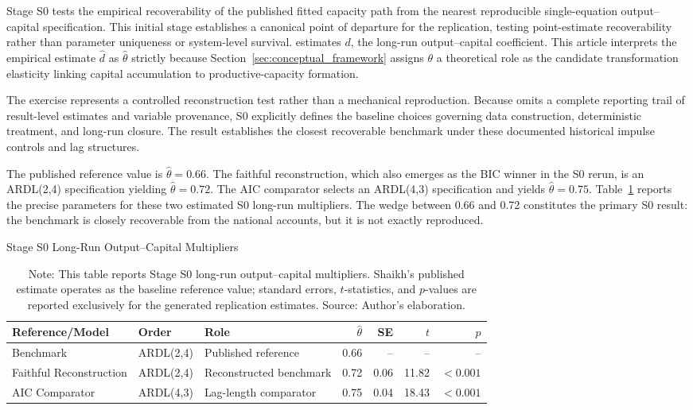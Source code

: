 \documentclass[11pt]{article}
\begin{document}
Stage S0 tests the empirical recoverability of the published fitted capacity path from the nearest reproducible single-equation output--capital specification. This initial stage establishes a canonical point of departure for the replication, testing point-estimate recoverability rather than parameter uniqueness or system-level survival. \citet{Shaikh2016} estimates $d$, the long-run output--capital coefficient. This article interprets the empirical estimate $\hat{d}$ as $\hat{\theta}$ strictly because Section~\ref{sec:conceptual_framework} assigns $\theta$ a theoretical role as the candidate transformation elasticity linking capital accumulation to productive-capacity formation.

The exercise represents a controlled reconstruction test rather than a mechanical reproduction. Because \citet{Shaikh2016} omits a complete reporting trail of result-level estimates and variable provenance, S0 explicitly defines the baseline choices governing data construction, deterministic treatment, and long-run closure. The result establishes the closest recoverable benchmark under these documented historical impulse controls and lag structures. 

The published reference value is $\hat{\theta}=0.66$. The faithful reconstruction, which also emerges as the BIC winner in the S0 rerun, is an ARDL(2,4) specification yielding $\hat{\theta}=0.72$. The AIC comparator selects an ARDL(4,3) specification and yields $\hat{\theta}=0.75$. Table~\ref{tab:s0_model_lr_summary} reports the precise parameters for these two estimated S0 long-run multipliers. The wedge between 0.66 and 0.72 constitutes the primary S0 result: the benchmark is closely recoverable from the national accounts, but it is not exactly reproduced.

\begin{table}[H]
\centering
\caption{Stage S0 Long-Run Output--Capital Multipliers}
\label{tab:s0_model_lr_summary}
\footnotesize
\begin{tabular}{lllrrrr}
\toprule
Reference/Model & Order & Role & $\hat{\theta}$ & SE & $t$ & $p$ \\
\midrule
\midrule
\citet{Shaikh2016} Benchmark & ARDL(2,4) & Published reference & 0.66 & -- & -- & -- \\
Faithful Reconstruction & ARDL(2,4) & Reconstructed benchmark & 0.72 & 0.06 & 11.82 & $<0.001$ \\
AIC Comparator & ARDL(4,3) & Lag-length comparator & 0.75 & 0.04 & 18.43 & $<0.001$ \\
\bottomrule
\end{tabular}
\caption*{Note: This table reports Stage S0 long-run output--capital multipliers. Shaikh's published estimate operates as the baseline reference value; standard errors, $t$-statistics, and $p$-values are reported exclusively for the generated replication estimates. Source: Author's elaboration.}
\end{table}
\end{document}
